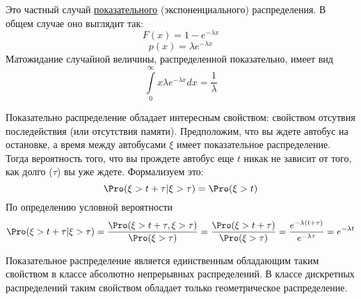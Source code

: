 Это частный случай \underline{показательного} (экспоненциального) распределения. В общем случае оно выглядит так:
$$F(x) = 1 - e^{-\lambda x}$$
$$p(x) = \lambda e^{-\lambda x}$$
Матожидание случайной величины, распределенной показательно, имеет вид
$$\int\limits_0^{\infty} x\lambda e^{-\lambda x}dx = \frac1{\lambda}$$

Показательно распределение обладает интересным свойством: свойством отсутвия последействия (или отсутствия памяти). Предположим, что вы ждете автобус на 
остановке, а время между автобусами $\xi$ имеет показательное распределение. Тогда вероятность того, что вы прождете автобус еще $t$ никак не зависит от того, 
как долго ($\tau$) вы уже ждете. Формализуем это:
$$ \Pro(\xi > t + \tau | \xi > \tau) = \Pro(\xi > t)$$
По определению условной вероятности
$$\Pro(\xi > t + \tau | \xi > \tau) = \frac{\Pro(\xi > t + \tau, \xi > \tau)}{\Pro(\xi > \tau)} = \frac{\Pro(\xi > t + \tau)}{\Pro(\xi > \tau)} = \frac{e^{-\lambda(t+\tau)}}{e^{-\lambda \tau}} = e^{-\lambda t}$$

Показательное распределение является единственным обладающим таким свойством в классе абсолютно непрерывных распределений. В классе дискретных распределений таким свойством обладает только геометрическое распределение.

\newpage

